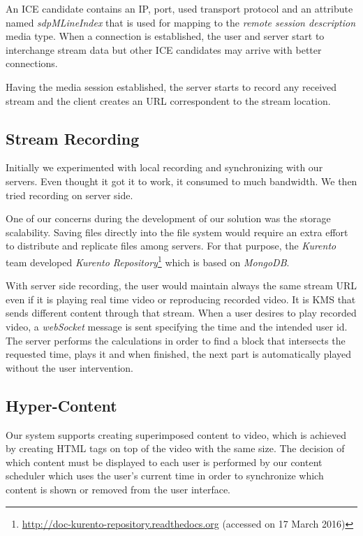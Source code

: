 \documentclass[conference,compsoc,a4paper]{IEEEtran}
\begin{document}
An \gls{ICE} candidate contains an \gls{IP}, port, used transport protocol and an attribute named \emph{sdpMLineIndex} that is used for mapping to the \emph{remote session description} media type.
When a connection is established, the user and server start to interchange stream data but other \gls{ICE} candidates may arrive with better connections.

Having the media session established, the server starts to record any received stream and the client creates an \gls{URL} correspondent to the stream location.

\subsection{Stream Recording}
 Initially we experimented with local recording and synchronizing with our servers. Even thought it got it to work, it consumed to much bandwidth. We then tried recording on server side.

	One of our concerns during the development of our solution was the storage scalability. Saving files directly into the file system would require an extra effort to distribute and replicate files among servers. For that purpose, the \emph{Kurento} team developed \emph{Kurento Repository}\footnote{\url{http://doc-kurento-repository.readthedocs.org} (accessed on 17 March 2016)} which is based on \emph{MongoDB}.


	With server side recording, the user would maintain always the same stream \gls{URL} even if it is playing real time video or reproducing recorded video. It is \gls{KMS} that sends different content through that stream. When a user desires to play recorded video, a \emph{webSocket} message is sent specifying the time and the intended user id. The server performs the calculations in order to find a block that intersects the requested time, plays it and when finished, the next part is automatically played without the user intervention.



\subsection{Hyper-Content}

	Our system supports creating superimposed content to video, which is achieved by creating \gls{HTML} tags on top of the video  with the same size. The decision of which content must be displayed to each user is performed by our content scheduler which uses the user's current time in order to synchronize which content is shown or removed from the user interface.
\end{document}
